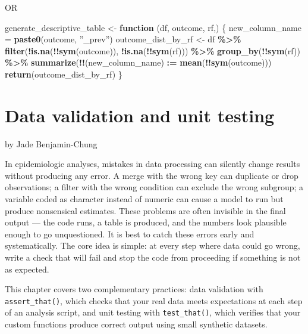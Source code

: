 \documentclass[
]{book}
\newenvironment{Shaded}{\begin{snugshade}}{\end{snugshade}}
\newcommand{\ControlFlowTok}[1]{\textcolor[rgb]{0.13,0.29,0.53}{\textbf{#1}}}
\newcommand{\FunctionTok}[1]{\textcolor[rgb]{0.13,0.29,0.53}{\textbf{#1}}}
\newcommand{\NormalTok}[1]{#1}
\newcommand{\OtherTok}[1]{\textcolor[rgb]{0.56,0.35,0.01}{#1}}
\newcommand{\SpecialCharTok}[1]{\textcolor[rgb]{0.81,0.36,0.00}{\textbf{#1}}}
\begin{document}
OR

\begin{Shaded}
\begin{Highlighting}[]
\NormalTok{generate\_descriptive\_table }\OtherTok{\textless{}{-}} \ControlFlowTok{function}\NormalTok{ (df, outcome, rf,) \{}
\NormalTok{  new\_column\_name }\OtherTok{=} \FunctionTok{paste0}\NormalTok{(outcome, ”\_prev”)}
\NormalTok{  outcome\_dist\_by\_rf }\OtherTok{\textless{}{-}}\NormalTok{ df }\SpecialCharTok{\%\textgreater{}\%} 
  \FunctionTok{filter}\NormalTok{(}\SpecialCharTok{!}\FunctionTok{is.na}\NormalTok{(}\SpecialCharTok{!!}\FunctionTok{sym}\NormalTok{(outcome)), }\SpecialCharTok{!}\FunctionTok{is.na}\NormalTok{(}\SpecialCharTok{!!}\FunctionTok{sym}\NormalTok{(rf))) }\SpecialCharTok{\%\textgreater{}\%} 
  \FunctionTok{group\_by}\NormalTok{(}\SpecialCharTok{!!}\FunctionTok{sym}\NormalTok{(rf)) }\SpecialCharTok{\%\textgreater{}\%}
  \FunctionTok{summarize}\NormalTok{(}\SpecialCharTok{!!}\NormalTok{(new\_column\_name) }\SpecialCharTok{:=} \FunctionTok{mean}\NormalTok{(}\SpecialCharTok{!!}\FunctionTok{sym}\NormalTok{(outcome))) }
  \FunctionTok{return}\NormalTok{(outcome\_dist\_by\_rf)}
\NormalTok{\}}
\end{Highlighting}
\end{Shaded}

\chapter{Data validation and unit testing}\label{data-validation}

by Jade Benjamin-Chung

In epidemiologic analyses, mistakes in data processing can silently change results without producing any error. A merge with the wrong key can duplicate or drop observations; a filter with the wrong condition can exclude the wrong subgroup; a variable coded as character instead of numeric can cause a model to run but produce nonsensical estimates. These problems are often invisible in the final output --- the code runs, a table is produced, and the numbers look plausible enough to go unquestioned. It is best to catch these errors early and systematically. The core idea is simple: at every step where data could go wrong, write a check that will fail and stop the code from proceeding if something is not as expected.

This chapter covers two complementary practices: data validation with \texttt{assert\_that()}, which checks that your real data meets expectations at each step of an analysis script, and unit testing with \texttt{test\_that()}, which verifies that your custom functions produce correct output using small synthetic datasets.
\end{document}
